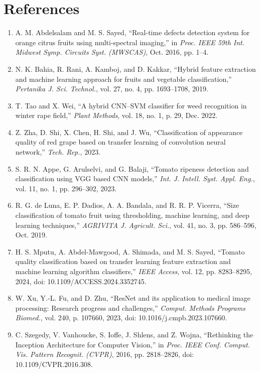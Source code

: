 \documentclass[12pt,a4paper]{report}
\begin{document}
	
	\setcounter{page}{27}
	
	\section*{References}	
\begin{enumerate}
	\item A. M. Abdelsalam and M. S. Sayed, ``Real-time defects detection system for orange citrus fruits using multi-spectral imaging,'' in \textit{Proc. IEEE 59th Int. Midwest Symp. Circuits Syst. (MWSCAS)}, Oct. 2016, pp. 1--4.
	\item N. K. Bahia, R. Rani, A. Kamboj, and D. Kakkar, ``Hybrid feature extraction and machine learning approach for fruits and vegetable classification,'' \textit{Pertanika J. Sci. Technol.}, vol. 27, no. 4, pp. 1693--1708, 2019.
	\item T. Tao and X. Wei, ``A hybrid CNN–SVM classifier for weed recognition in winter rape field,'' \textit{Plant Methods}, vol. 18, no. 1, p. 29, Dec. 2022.
	\item Z. Zha, D. Shi, X. Chen, H. Shi, and J. Wu, ``Classification of appearance quality of red grape based on transfer learning of convolution neural network,'' \textit{Tech. Rep.}, 2023.
	\item S. R. N. Appe, G. Arulselvi, and G. Balaji, ``Tomato ripeness detection and classification using VGG based CNN models,'' \textit{Int. J. Intell. Syst. Appl. Eng.}, vol. 11, no. 1, pp. 296--302, 2023.
	\item R. G. de Luna, E. P. Dadios, A. A. Bandala, and R. R. P. Vicerra, ``Size classification of tomato fruit using thresholding, machine learning, and deep learning techniques,'' \textit{AGRIVITA J. Agricult. Sci.}, vol. 41, no. 3, pp. 586--596, Oct. 2019.
	\item H. S. Mputu, A. Abdel-Mawgood, A. Shimada, and M. S. Sayed, ``Tomato quality classification based on transfer learning feature extraction and machine learning algorithm classifiers,'' \textit{IEEE Access}, vol. 12, pp. 8283--8295, 2024, doi: 10.1109/ACCESS.2024.3352745.
	\item W. Xu, Y.-L. Fu, and D. Zhu, ``ResNet and its application to medical image processing: Research progress and challenges,'' \textit{Comput. Methods Programs Biomed.}, vol. 240, p. 107660, 2023, doi: 10.1016/j.cmpb.2023.107660.
	\item C. Szegedy, V. Vanhoucke, S. Ioffe, J. Shlens, and Z. Wojna, ``Rethinking the Inception Architecture for Computer Vision,'' in \textit{Proc. IEEE Conf. Comput. Vis. Pattern Recognit. (CVPR)}, 2016, pp. 2818--2826, doi: 10.1109/CVPR.2016.308.

\end{enumerate}
\end{document}
